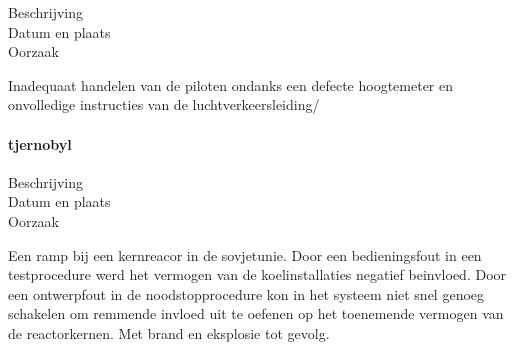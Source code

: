 \begin{description}
	\item[Beschrijving]
	\item[Datum en plaats] 
	\item[Oorzaak]
\end{description}
Inadequaat handelen van de piloten ondanks een defecte hoogtemeter en onvolledige instructies van de luchtverkeersleiding/

\cite{catsr25022009Boeing737AmsterdamCrash}

\cite{zuilen23022019Tijdlijnpoldercrash}
\cite{wikinews04032009techfoutailines1951}
\cite{luchtvaartnieuws21012020boeing737conclusies}
\cite{adformatie280220209communicatiegebreken}
\cite{spinnael25022009onderzoekpolderbaancrash}
\cite{crashTurkishAirlines}
\cite{flightradar24}
\cite{flightstatstracker}


\paragraph{tjernobyl}

\begin{description}
	\item[Beschrijving]
	\item[Datum en plaats] 
	\item[Oorzaak]
\end{description}
Een ramp bij een kernreacor in de sovjetunie. Door een bedieningsfout in een testprocedure werd het vermogen van de koelinstallaties negatief beinvloed. Door een ontwerpfout in de noodstopprocedure kon in het systeem niet snel genoeg schakelen om remmende invloed uit te oefenen op het toenemende vermogen van de reactorkernen. Met brand en eksplosie tot gevolg.

